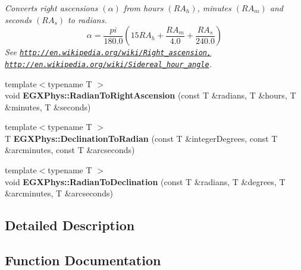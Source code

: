\begin{DoxyCompactItemize}
\begin{DoxyCompactList}\small\item\em Converts right ascensions $(\alpha)$ from hours $(RA_h)$, minutes $(RA_m)$ and seconds $(RA_s)$ to radians. \[\alpha=\frac{pi}{180.0}(15 RA_h + \frac{RA_m}{4.0} + \frac{RA_s}{240.0})\] See \href{http://en.wikipedia.org/wiki/Right_ascension,}{\tt http\+://en.\+wikipedia.\+org/wiki/\+Right\+\_\+ascension,} \href{http://en.wikipedia.org/wiki/Sidereal_hour_angle}{\tt http\+://en.\+wikipedia.\+org/wiki/\+Sidereal\+\_\+hour\+\_\+angle}. \end{DoxyCompactList}\item 
\mbox{\label{group___e_g_x_phys-_right_ascension_and_declination_ga50c306a7d118d3b3c02bc3621e1cb078}} 
{\footnotesize template$<$typename T $>$ }\\void {\bfseries E\+G\+X\+Phys\+::\+Radian\+To\+Right\+Ascension} (const T \&radians, T \&hours, T \&minutes, T \&seconds)
\item 
\mbox{\label{group___e_g_x_phys-_right_ascension_and_declination_gaeddd0fbc1c695863bf2bbc2a948b9b59}} 
{\footnotesize template$<$typename T $>$ }\\T {\bfseries E\+G\+X\+Phys\+::\+Declination\+To\+Radian} (const T \&integer\+Degrees, const T \&arcminutes, const T \&arcseconds)
\item 
\mbox{\label{group___e_g_x_phys-_right_ascension_and_declination_gaa91fc4b5a4ac9e9dc94aff7b8f6f9bd1}} 
{\footnotesize template$<$typename T $>$ }\\void {\bfseries E\+G\+X\+Phys\+::\+Radian\+To\+Declination} (const T \&radians, T \&degrees, T \&arcminutes, T \&arcseconds)
\end{DoxyCompactItemize}


\subsection{Detailed Description}


\subsection{Function Documentation}
\mbox{\label{group___e_g_x_phys-_right_ascension_and_declination_gad90de181361375b745a9b226fa13ba14}} 

